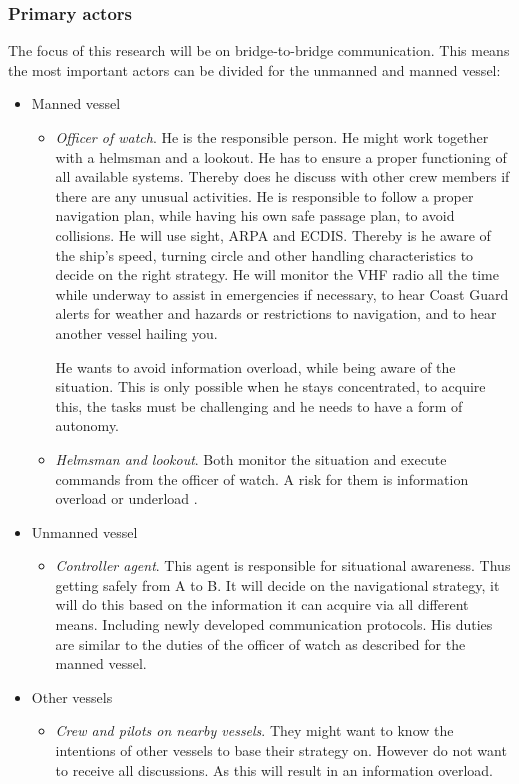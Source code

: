 \subsubsection{Primary actors}
The focus of this research will be on bridge-to-bridge communication. This means the most important actors can be divided for the unmanned and manned vessel:
\begin{itemize}
	\item Manned vessel
	\begin{itemize}
		\item \emph{Officer of watch}. He is the responsible person. He might work together with a helmsman and a lookout. He has to ensure a proper functioning of all available systems. Thereby does he discuss with other crew members if there are any unusual activities. He is responsible to follow a proper navigation plan, while having his own safe passage plan, to avoid collisions. He will use sight, \ac{ARPA} and \ac{ECDIS}. Thereby is he aware of the ship's speed, turning circle and other handling characteristics to decide on the right strategy. He will monitor the \ac{VHF} radio all the time while underway to assist in emergencies if necessary, to hear Coast Guard alerts for weather and hazards or restrictions to navigation, and to hear another vessel hailing you.
		
		He wants to avoid information overload, while being aware of the situation. This is only possible when he stays concentrated, to acquire this, the tasks must be challenging and he needs to have a form of autonomy.
	
		\item \emph{Helmsman and lookout}. Both monitor the situation and execute commands from the officer of watch. A risk for them is information overload or underload \cite{Neerincx2008}.
	\end{itemize}
		
	\item Unmanned vessel
	\begin{itemize}
		\item \emph{Controller agent}. This agent is responsible for situational awareness. Thus getting safely from A to B. It will decide on the navigational strategy, it will do this based on the information it can acquire via all different means. Including newly developed communication protocols. His duties are similar to the duties of the officer of watch as described for the manned vessel.
	\end{itemize}

	\item Other vessels
	\begin{itemize}
		\item \emph{Crew and pilots on nearby vessels}. They might want to know the intentions of other vessels to base their strategy on. However do not want to receive all discussions. As this will result in an information overload.
	\end{itemize}
	
\end{itemize}

